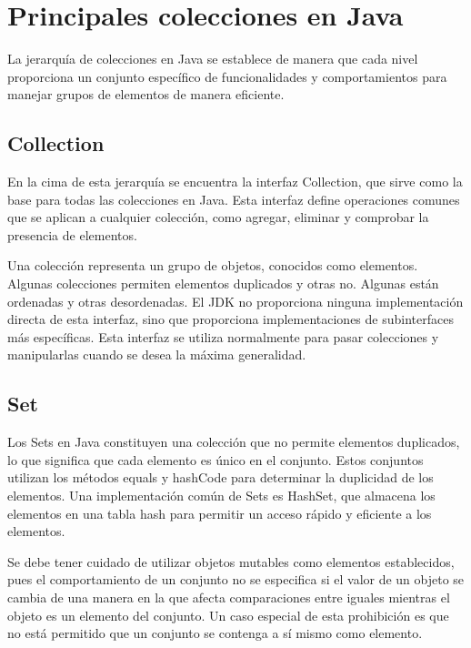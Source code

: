 \documentclass[a4paper,12pt]{article}
\begin{document}
\section{Principales colecciones en Java}

La jerarquía de colecciones en Java se establece de manera que cada nivel proporciona un conjunto específico de funcionalidades y comportamientos para manejar grupos de elementos de manera eficiente.

\subsection{Collection}

En la cima de esta jerarquía se encuentra la interfaz Collection, que sirve como la base para todas las colecciones en Java. Esta interfaz define operaciones comunes que se aplican a cualquier colección, como agregar, eliminar y comprobar la presencia de elementos.

Una colección representa un grupo de objetos, conocidos como elementos. Algunas colecciones permiten elementos duplicados y otras no. Algunas están ordenadas y otras desordenadas. El JDK no proporciona ninguna implementación directa de esta interfaz, sino que proporciona implementaciones de subinterfaces más específicas. Esta interfaz se utiliza normalmente para pasar colecciones y manipularlas cuando se desea la máxima generalidad. \cite{collection}

\subsection{Set}

Los Sets en Java constituyen una colección que no permite elementos duplicados, lo que significa que cada elemento es único en el conjunto. Estos conjuntos utilizan los métodos equals y hashCode para determinar la duplicidad de los elementos. Una implementación común de Sets es HashSet, que almacena los elementos en una tabla hash para permitir un acceso rápido y eficiente a los elementos.

Se debe tener cuidado de utilizar objetos mutables como elementos establecidos, pues el comportamiento de un conjunto no se especifica si el valor de un objeto se cambia de una manera en la que afecta comparaciones entre iguales mientras el objeto es un elemento del conjunto. Un caso especial de esta prohibición es que no está permitido que un conjunto se contenga a sí mismo como elemento.\cite{set}
\end{document}

